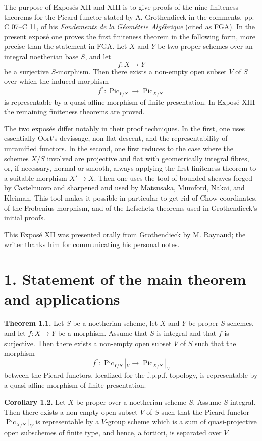 \documentclass[11pt]{article}
\providecommand{\Pic}{\operatorname{Pic}}
\begin{document}
The purpose of Exposés XII and XIII is to give proofs of the nine finiteness theorems for the Picard functor stated by A. Grothendieck in the comments, pp. C 07--C 11, of his \emph{Fondements de la Géométrie Algébrique} (cited as FGA). In the present exposé one proves the first finiteness theorem in the following form, more precise than the statement in FGA. Let \(X\) and \(Y\) be two proper schemes over an integral noetherian base \(S\), and let
\[
  f:X\longrightarrow Y
\]
be a surjective \(S\)-morphism. Then there exists a non-empty open subset \(V\) of \(S\) over which the induced morphism
\[
  f^*:\Pic_{Y/S}\longrightarrow \Pic_{X/S}
\]
is representable by a quasi-affine morphism of finite presentation. In Exposé XIII the remaining finiteness theorems are proved.

The two exposés differ notably in their proof techniques. In the first, one uses essentially Oort's devissage, non-flat descent, and the representability of unramified functors. In the second, one first reduces to the case where the schemes \(X/S\) involved are projective and flat with geometrically integral fibres, or, if necessary, normal or smooth, always applying the first finiteness theorem to a suitable morphism \(X'\to X\). Then one uses the tool of bounded sheaves forged by Castelnuovo and sharpened and used by Matsusaka, Mumford, Nakai, and Kleiman. This tool makes it possible in particular to get rid of Chow coordinates, of the Frobenius morphism, and of the Lefschetz theorems used in Grothendieck's initial proofs.

This Exposé XII was presented orally from Grothendieck by M. Raynaud; the writer thanks him for communicating his personal notes.

\section*{1. Statement of the main theorem and applications}

\textbf{Theorem 1.1.} Let \(S\) be a noetherian scheme, let \(X\) and \(Y\) be proper \(S\)-schemes, and let \(f:X\to Y\) be a morphism. Assume that \(S\) is integral and that \(f\) is surjective. Then there exists a non-empty open subset \(V\) of \(S\) such that the morphism
\[
  f^*:\Pic_{Y/S}|_V\longrightarrow \Pic_{X/S}|_V
\]
between the Picard functors, localized for the f.p.p.f. topology, is representable by a quasi-affine morphism of finite presentation.

\textbf{Corollary 1.2.} Let \(X\) be proper over a noetherian scheme \(S\). Assume \(S\) integral. Then there exists a non-empty open subset \(V\) of \(S\) such that the Picard functor \(\Pic_{X/S}|_V\) is representable by a \(V\)-group scheme which is a sum of quasi-projective open subschemes of finite type, and hence, a fortiori, is separated over \(V\).
\end{document}
